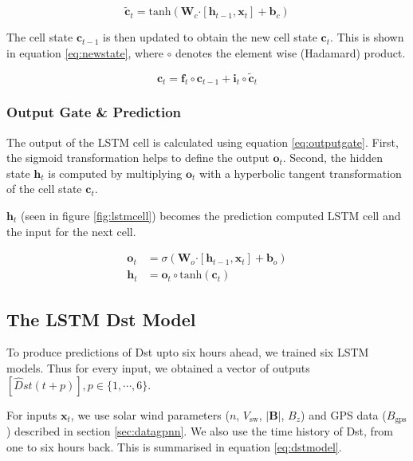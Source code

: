 \begin{equation}\label{eq:candidate}
 \tilde{\mathbf{c}}_{t} = \text{tanh} \left( \mathbf{W}_{c} \boldsymbol{\cdot}  \left[ \mathbf{h}_{t-1},\mathbf{x}_t \right] + 
 \mathbf{b}_{c} \right)
\end{equation}

The cell state  \( \mathbf{c}_{t-1} \) is then updated to obtain the new cell state \( \mathbf{c}_t \). This 
is shown in equation \ref{eq:newstate}, where $\circ$ denotes the element wise (Hadamard) product. 

\begin{equation}\label{eq:newstate}
 \mathbf{c}_t = \mathbf{f}_{t} \circ \mathbf{c}_{t-1} + \mathbf{i}_{t} \circ \tilde{\mathbf{c}}_{t}
\end{equation}

\subsubsection*{Output Gate \& Prediction}

The output of the LSTM cell is calculated using equation \ref{eq:outputgate}. First, the 
sigmoid transformation helps to define the output $\mathbf{o}_t$. Second, the hidden state $\mathbf{h}_t$ 
is computed by multiplying $\mathbf{o}_{t}$ with a hyperbolic tangent transformation of the cell state 
$\mathbf{c}_{t}$. 

$\mathbf{h}_{t}$ (seen in figure \ref{fig:lstmcell}) becomes the prediction computed LSTM cell and the input 
for the next cell.


\begin{align} \label{eq:outputgate}
	\mathbf{o}_{t} &= \sigma \left( 
		\mathbf{W}_o \boldsymbol{\cdot} \left[\mathbf{h}_{t-1}, \mathbf{x}_{t} \right] + \mathbf{b}_o \right) \\
	\mathbf{h}_{t} &= \mathbf{o}_{t} \circ \text{tanh}(\mathbf{c}_t)
\end{align}

\subsection{The LSTM Dst Model}

To produce predictions of Dst upto six hours ahead, we trained six LSTM models. Thus for every input, we 
obtained a vector of outputs $[\hat{D}st\left(t + p\right)], p\in \{ 1, \cdots, 6 \}$.

For inputs $\mathbf{x}_t$, we use solar wind parameters ($n$, $V_{\text{sw}}$, $|\mathbf{B}|$, $B_{z}$) 
and GPS data ($B_{\text{gps}}$) described in section \ref{sec:datagpnn}. We also use the time history of Dst, 
from one to six hours back. This is summarised in equation \ref{eq:dstmodel}.

